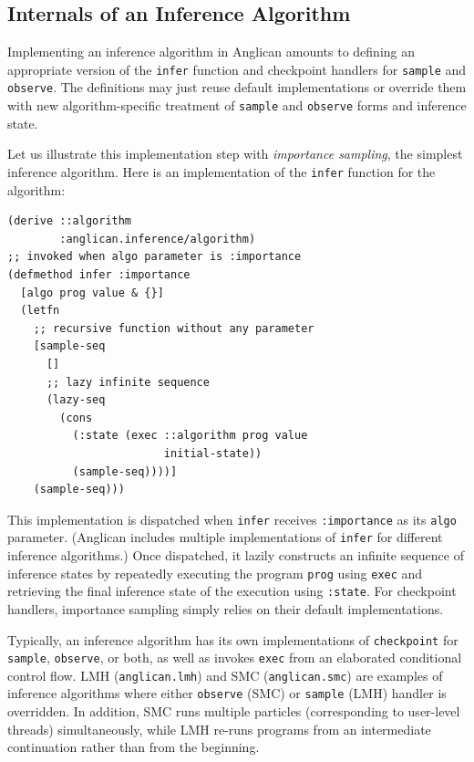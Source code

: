 \documentclass[preprint]{sigplanconf}
\begin{document}
\subsection{Internals of an Inference Algorithm}
\label{sec:internals}

Implementing an inference algorithm in Anglican amounts to
defining an appropriate version of the \texttt{infer} function
and checkpoint handlers for \texttt{sample} and
\texttt{observe}.  The definitions may just reuse default
implementations or override them with new algorithm-specific
treatment of \texttt{sample} and \texttt{observe} forms and
inference state.

Let us illustrate this implementation step with
\textit{importance sampling},
the simplest inference algorithm.
Here is an implementation of the \texttt{infer} function for the algorithm:
\begin{lstlisting}[style=default]
(derive ::algorithm
        :anglican.inference/algorithm)
;; invoked when algo parameter is :importance
(defmethod infer :importance 
  [algo prog value & {}]
  (letfn
    ;; recursive function without any parameter
    [sample-seq 
      []
      ;; lazy infinite sequence 
      (lazy-seq
        (cons
          (:state (exec ::algorithm prog value
                        initial-state))
          (sample-seq))))]
    (sample-seq)))
\end{lstlisting}
This implementation is dispatched 
when \texttt{infer} receives \texttt{:importance} as its \texttt{algo} 
parameter. (Anglican includes multiple implementations of \texttt{infer}
for different inference algorithms.) Once dispatched, it lazily 
constructs an infinite sequence of inference states by repeatedly 
executing the program \texttt{prog} using \texttt{exec}
and retrieving the final inference state of the execution 
using \texttt{:state}. For checkpoint handlers, importance sampling simply
relies on their default implementations.

Typically, an inference
algorithm has its own implementations of
\texttt{checkpoint} for \texttt{sample}, \texttt{observe}, or
both, as well as invokes \texttt{exec} from an elaborated
conditional control flow. LMH (\texttt{anglican.lmh}) and SMC
(\texttt{anglican.smc}) are examples of inference algorithms
where either \texttt{observe} (SMC) or \texttt{sample} (LMH)
handler is overridden. In addition, SMC runs multiple particles
(corresponding to user-level threads) simultaneously, while LMH re-runs
programs from an intermediate continuation rather than from the
beginning.
\end{document}
